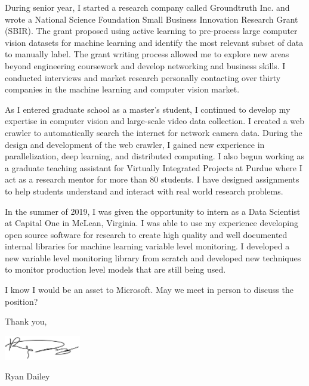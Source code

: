 \documentclass[10pt]{article}
\newlength{\cvaftersectionskipamount}
\newcommand{\company}{Microsoft}
\newcommand{\job}{SOMEJOB}
\begin{document}
During senior year, I started a research company called Groundtruth Inc. and wrote a National Science Foundation Small Business Innovation Research Grant (SBIR). The grant proposed using active learning to pre-process large computer vision datasets for machine learning and identify the most relevant subset of data to manually label. The grant writing process allowed me to explore new areas beyond engineering coursework and develop networking and business skills. I conducted interviews and market research personally contacting over thirty companies in the machine learning and computer vision market.  

As I entered graduate school as a master's student, I continued to develop my expertise in computer vision and large-scale video data collection. I created a web crawler to automatically search the internet for network camera data. During the design and development of the web crawler, I gained new experience in parallelization, deep learning, and distributed computing. I also begun working as a graduate teaching assistant for Virtually Integrated Projects at Purdue where I act as a research mentor for more than 80 students. I have designed assignments to help students understand and interact with real world research problems. 

In the summer of 2019, I was given the opportunity to intern as a Data Scientist at Capital One in McLean, Virginia. I was able to use my experience developing open source software for research to create high quality and well documented internal libraries for machine learning variable level monitoring. I developed a new variable level monitoring library from scratch and developed new techniques to monitor production level models that are still being used.  

\vspace{\cvaftersectionskipamount}

\noindent I know I would be an asset to \company. 
May we meet in person to discuss the position?  

\vspace{2\cvaftersectionskipamount}

\noindent Thank you, 

\vspace{\cvaftersectionskipamount}

\includegraphics[height=30pt]{Signature.pdf}

Ryan Dailey 
\end{document}
